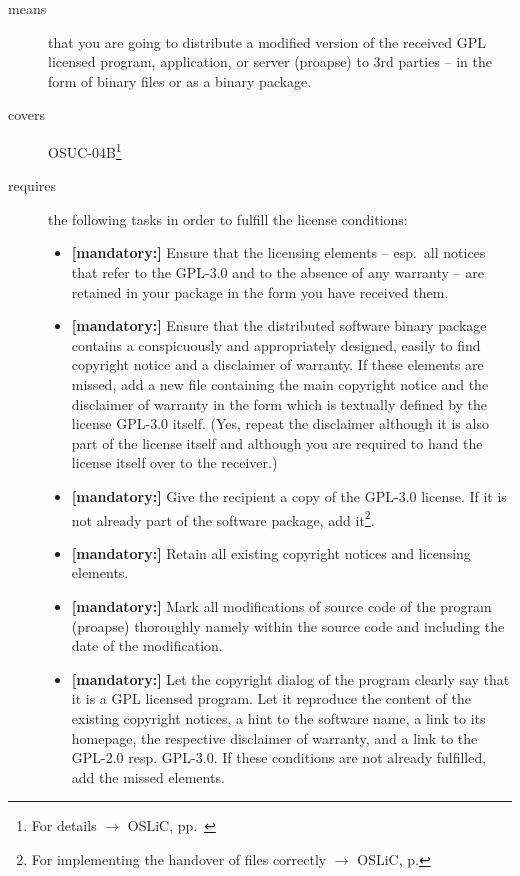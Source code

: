 \begin{description}
\item[means] that you are going to distribute a modified version of the received
GPL licensed pro\-gram, application, or server (proapse) to 3rd parties -- in
the form of binary files or as a binary package.
\item[covers] OSUC-04B\footnote{For details $\rightarrow$ OSLiC, pp.\
\pageref{OSUC-04B-DEF}}

\item[requires] the following tasks in order to fulfill the license conditions:
\begin{itemize}

  \item \textbf{[mandatory:]} Ensure that the licensing elements -- esp.\ all
  notices that refer to the GPL-3.0 and to the absence of any
  warranty -- are retained in your package in the form you have received them.

  \item \textbf{[mandatory:]} Ensure that the distributed software binary
  package contains a conspicuously and appropriately designed, easily to find
  copyright notice and a disclaimer of warranty. If these elements are missed,
  add a new file containing the main copyright notice and the disclaimer of
  warranty in the form which is textually defined by the license GPL-3.0 itself.
  (Yes, repeat the disclaimer although it is also part of the license itself and
  although you are required to hand the license itself over to the receiver.)
  
  \item \textbf{[mandatory:]} Give the recipient a copy of the GPL-3.0 license.
  If it is not already part of the software package, add it\footnote{For
  implementing the handover of files correctly $\rightarrow$ OSLiC, p.
  \pageref{DistributingFilesHint}}.
  
  \item \textbf{[mandatory:]} Retain all existing copyright notices and
  licensing elements.
  
  \item \textbf{[mandatory:]} Mark all modifications of source code of the
  program (proapse) thoroughly namely within the source code and including
  the date of the modification.

  \item \textbf{[mandatory:]} Let the copyright dialog of the program clearly
  say that it is a GPL licensed program. Let it reproduce the content of the
  existing copyright notices, a hint to the software name, a link to its
  homepage, the respective disclaimer of warranty, and a link to the GPL-2.0
  resp. GPL-3.0. If these conditions are not already fulfilled, add the missed
  elements.
  

\end{itemize}
\end{description}

